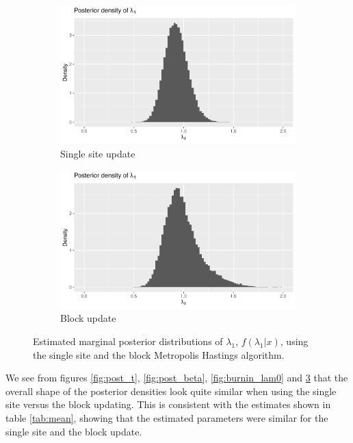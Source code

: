 \begin{figure}[H]
    \centering
    \begin{subfigure}[b]{0.49\textwidth}
        \centering
        \includegraphics[width = \textwidth]{Images/post_lambda_1_single.pdf}
        \caption{Single site update}
        \label{fig:post_lambda_1_single}
    \end{subfigure}
    \begin{subfigure}[b]{0.49\textwidth}
        \centering
        \includegraphics[width = \textwidth]{Images/post_lambda_1_block.pdf}
        \caption{Block update}
        \label{fig:post_lambda_1_block}
    \end{subfigure}
     \caption{Estimated marginal posterior distributions of $\lambda_1$, $f(\lambda_1|x)$, using the single site and the block Metropolis Hastings algorithm.}
    \label{fig:post_lam1}
\end{figure}


We see from figures \ref{fig:post_t}, \ref{fig:post_beta}, \ref{fig:burnin_lam0} and \ref{fig:post_lam1} that the overall shape of the posterior densities look quite similar when using the single site versus the block updating. This is consistent with the estimates shown in table \ref{tab:mean}, showing that the estimated parameters were similar for the single site and the block update. 





